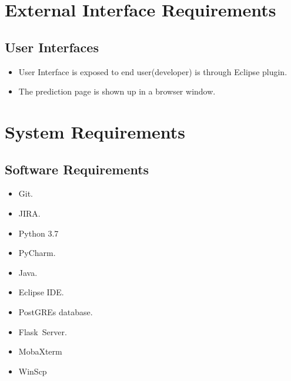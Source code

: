 \documentclass[oneside,a4paper,12pt]{book}
\begin{document}
\section{External Interface Requirements}

\subsection{User Interfaces}
\begin{itemize}
    \item User Interface is exposed to end user(developer) is through Eclipse plugin.\par
    \item The prediction page is shown up in a browser window.
\end{itemize}

\section{System Requirements}
\subsection{Software Requirements}
\setlength{\parskip}{0.0pt}
\begin{itemize}
	\item Git.\par

	\item JIRA.\par

	\item Python 3.7\par

	\item PyCharm.\par

	\item Java.\par

	\item Eclipse IDE.\par

	\item PostGREs database.\par

	\item Flask\  Server.
	\item MobaXterm\par
	\item WinScp \par
\end{itemize}\par
\end{document}
